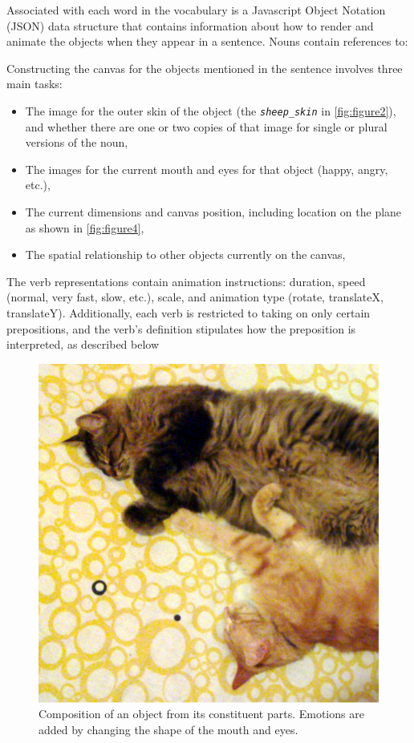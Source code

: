 \documentclass{sigchi-ext}
\begin{document}
Associated with each word in the vocabulary is a Javascript Object Notation (JSON) data structure that contains information about how to render and animate the objects when they appear in a sentence.
Nouns contain references to:

Constructing the canvas for the objects mentioned in the sentence involves three main tasks:

\begin{itemize}\compresslist
\item 	
The image for the outer skin of the object (the \emph \texttt {sheep\_skin} in \autoref {fig:figure2}), and whether there are one or two copies of that image for single or plural versions of the noun,
\item 	
The images for the current mouth and eyes for that object  (happy, angry, etc.),
\item 	
The current dimensions and canvas position, including location on the plane as shown in \autoref {fig:figure4},
\item 	
The spatial relationship to other objects currently on the canvas,
\end{itemize}

The verb representations contain animation instructions: duration, speed (normal, very fast, slow, etc.), scale, and animation type (rotate, translateX, translateY).  Additionally, each verb is restricted to taking on only certain prepositions, and the verb’s definition stipulates how the preposition is interpreted, as described below

\begin{figure}
  \centering
  \includegraphics[width=0.7\columnwidth]{figures/cats.png}
  \caption{Composition of an object from its constituent parts.  Emotions are added by changing the shape of the mouth and eyes.}
  \label{fig:figure4}
\end{figure}
\end{document}

